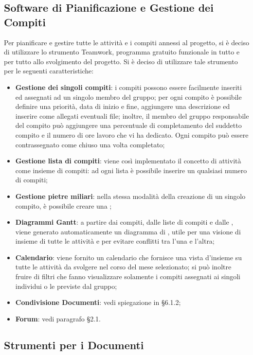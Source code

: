 \subsection{Software di Pianificazione e Gestione dei Compiti}
Per pianificare e gestire tutte le attività e i compiti annessi al progetto, si è deciso di utilizzare lo strumento Teamwork, programma gratuito funzionale in tutto e per tutto allo svolgimento del progetto. Si è deciso di utilizzare tale strumento per le seguenti caratteristiche:
\begin{itemize}
\item \textbf{Gestione dei singoli compiti}: i compiti possono essere facilmente inseriti ed assegnati ad un singolo membro del gruppo; per ogni compito è possibile definire una priorità, data di inizio e fine, aggiungere una descrizione ed inserire come allegati eventuali file; inoltre, il membro del gruppo responsabile del compito può aggiungere una percentuale di completamento del suddetto compito e il numero di ore lavoro che vi ha dedicato. Ogni compito può essere contrassegnato come chiuso una volta completato;
\item \textbf{Gestione lista di compiti}: viene così implementato il concetto di attività come insieme di compiti: ad ogni lista è possibile inserire un qualsiasi numero di compiti;
\item \textbf{Gestione pietre miliari}: nella stessa modalità della creazione di un singolo compito, è possibile creare una ;
\item \textbf{Diagrammi Gantt}: a partire dai compiti, dalle liste di compiti e dalle , viene generato automaticamente un diagramma di , utile per una visione di insieme di tutte le attività e per evitare conflitti tra l'una e l'altra;
\item \textbf{Calendario}: viene fornito un calendario che fornisce una vista d'insieme su tutte le attività da svolgere nel corso del mese selezionato; si può inoltre fruire di filtri che fanno visualizzare solamente i compiti assegnati ai singoli individui o le  previste dal gruppo;
\item \textbf{Condivisione Documenti}: vedi spiegazione in §6.1.2;
\item \textbf{Forum}: vedi paragrafo §2.1.
\end{itemize}

\subsection{Strumenti per i Documenti}
